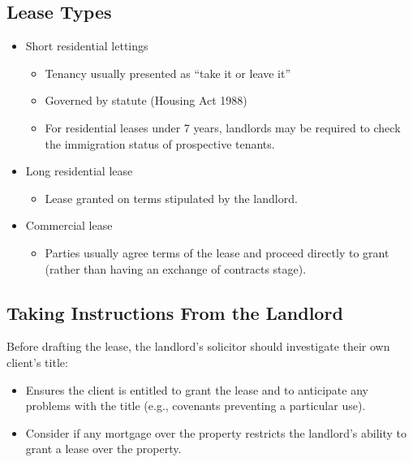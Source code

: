 \documentclass[
]{article}
\providecommand{\tightlist}{%
  \setlength{\itemsep}{0pt}\setlength{\parskip}{0pt}}
\begin{document}
\hypertarget{lease-types}{%
\subsection{Lease Types}\label{lease-types}}

\begin{itemize}
\tightlist
\item
  Short residential lettings

  \begin{itemize}
  \tightlist
  \item
    Tenancy usually presented as ``take it or leave it''
  \item
    Governed by statute (Housing Act 1988)
  \item
    For residential leases under 7 years, landlords may be required to
    check the immigration status of prospective tenants.
  \end{itemize}
\item
  Long residential lease

  \begin{itemize}
  \tightlist
  \item
    Lease granted on terms stipulated by the landlord.
  \end{itemize}
\item
  Commercial lease

  \begin{itemize}
  \tightlist
  \item
    Parties usually agree terms of the lease and proceed directly to
    grant (rather than having an exchange of contracts stage).
  \end{itemize}
\end{itemize}

\hypertarget{taking-instructions-from-the-landlord}{%
\subsection{Taking Instructions From the
Landlord}\label{taking-instructions-from-the-landlord}}

Before drafting the lease, the landlord's solicitor should investigate
their own client's title:

\begin{itemize}
\tightlist
\item
  Ensures the client is entitled to grant the lease and to anticipate
  any problems with the title (e.g., covenants preventing a particular
  use).
\item
  Consider if any mortgage over the property restricts the landlord's
  ability to grant a lease over the property.
\end{itemize}
\end{document}
